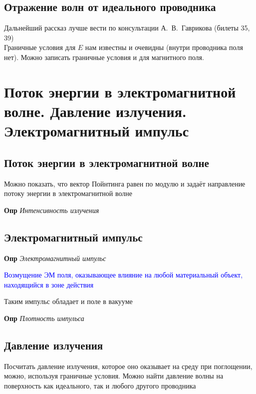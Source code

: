 \documentclass[a4paper, 14pt]{article}
\begin{document}
    \subsection{Отражение волн от идеального проводника}
    
    Дальнейший рассказ лучше вести по консультации А.~В.~Гаврикова (билеты 35, 39) \\
    
    Граничные условия для $E$ нам известны и очевидны (внутри проводника поля нет).
    Можно записать граничные условия и для магнитного поля.
    
    \section{Поток энергии в электромагнитной волне.
    Давление излучения.
    Электромагнитный импульс}
    
    \subsection{Поток энергии в электромагнитной волне}
    
    Можно показать, что вектор Пойнтинга равен по модулю и задаёт направление потоку энергии в электромагнитной волне
    
    \textbf{Опр} \textit{Интенсивность излучения}
    
    \subsection{Электромагнитный импульс}
    
    \textbf{Опр} \textit{Электромагнитный импульс}
    
    \textcolor{blue}{Возмущение ЭМ поля, оказывающее влияние на любой материальный объект, находящийся в зоне действия}
    
    Таким импульс обладает и поле в вакууме
    
    \textbf{Опр} \textit{Плотность импульса}
    
    \subsection{Давление излучения}

    
    Посчитать давление излучения, которое оно оказывает на среду при поглощении, можно, используя граничные условия.
    Можно найти давление волны на поверхность как идеального, так и любого другого проводника
    
\end{document}
